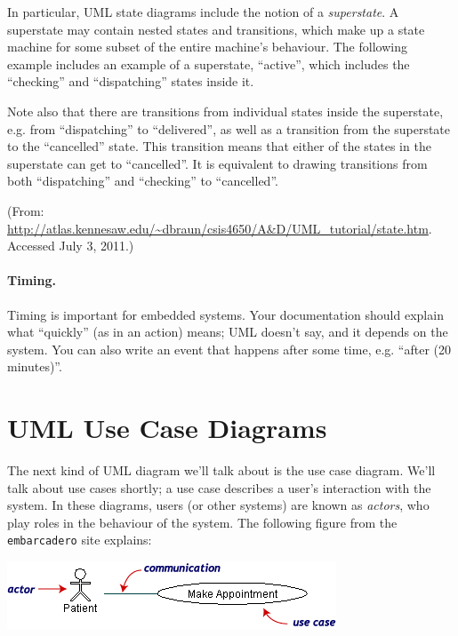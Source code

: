 In particular, UML state diagrams include the notion of a \emph{superstate}.
A superstate may contain nested states and transitions, which make up a
state machine for some subset of the entire machine's behaviour. The following
example includes an example of a superstate, ``active'', which includes the
``checking'' and ``dispatching'' states inside it.

Note also that there are transitions from individual states inside the
superstate, e.g. from ``dispatching'' to ``delivered'', as well as a transition
from the superstate to the ``cancelled'' state. This transition means that
either of the states in the superstate can get to ``cancelled''. It is
equivalent to drawing transitions from both ``dispatching'' and ``checking''
to ``cancelled''.

\begin{center}


(From: \url{http://atlas.kennesaw.edu/~dbraun/csis4650/A&D/UML_tutorial/state.htm}. Accessed July 3, 2011.)
\end{center}

\paragraph{Timing.} Timing is important for embedded systems.
Your documentation should explain what ``quickly'' (as in an action)
means; UML doesn't say, and it depends on the system.  You can also
write an event that happens after some time, e.g. ``after (20
minutes)''. 

\section*{UML Use Case Diagrams}
The next kind of UML diagram we'll talk about is the use case diagram.
We'll talk about use cases shortly; a use case describes a user's
interaction with the system. In these diagrams, users (or other systems) 
are known as
\emph{actors}, who play roles in the behaviour of the system.  The
following figure from the {\tt embarcadero} site explains:

\begin{center}
\includegraphics[width=.5\textwidth]{images/usecase-explanation.png}
\end{center}


